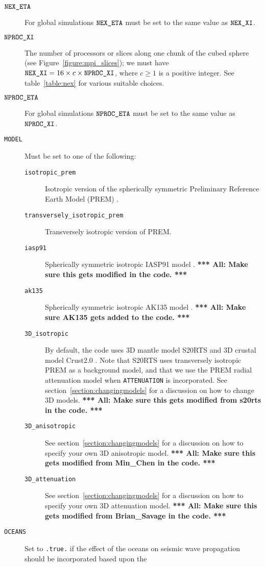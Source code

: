 \documentclass[onecolumn]{article}
\newcommand{\toall}[1]{\textbf{*** All: #1 ***}}
\newcommand{\nexxi}{\mbox{\texttt{NEX\_XI}}}
\newcommand{\nexeta}{\mbox{\texttt{NEX\_ETA}}}
\newcommand{\nprocxi}{\mbox{\texttt{NPROC\_XI}}}
\newcommand{\nproceta}{\mbox{\texttt{NPROC\_ETA}}}
\begin{document}
\begin{description}
\item[$\nexeta$] For global simulations $\nexeta$
must be set to the same value as $\nexxi$.
\item[$\nprocxi$] The number of processors or slices along one
chunk of the cubed sphere (see Figure~\ref{figure:mpi_slices});
we must have $\nexxi=16\times c\times \nprocxi$, where
$c\ge1$ is a positive integer.
See table~\ref{table:nex} for various suitable choices.
\item[$\nproceta$] For global simulations $\nproceta$
must be set to the same value as $\nprocxi$.
\item[\texttt{MODEL}] Must be set to one of the following:
\begin{description}
\item[\texttt{isotropic\_prem}] Isotropic version of the spherically symmetric
Preliminary Reference Earth Model (PREM) \cite{DzAn81}.
\item[\texttt{transversely\_isotropic\_prem}] Transversely
isotropic version of PREM.
\item[\texttt{iasp91}] Spherically symmetric isotropic IASP91 model \cite{KeEn91}.
\toall{Make sure this gets modified in the code.}
\item[\texttt{ak135}] Spherically symmetric isotropic AK135 model \cite{KeEnBu95}.
\toall{Make sure AK135 gets added to the code.}
\item[\texttt{3D\_isotropic}] By default,
the code uses 3D mantle model S20RTS \cite{RiVaWo99}
and 3D crustal model Crust2.0 \cite{BaLaMa00}.
Note that S20RTS uses transversely isotropic PREM as a background model,
and that we use the PREM radial attenuation model when
\texttt{ATTENUATION} is incorporated.
See section~\ref{section:changingmodels} for a discussion on
how to change 3D models.
\toall{Make sure this gets modified from s20rts in the code.}
\item[\texttt{3D\_anisotropic}]
See section~\ref{section:changingmodels} for a discussion on
how to specify your own 3D anisotropic model.
\toall{Make sure this gets modified from Min\_Chen in the code.}
\item[\texttt{3D\_attenuation}]
See section~\ref{section:changingmodels} for a discussion on
how to specify your own 3D attenuation model.
\toall{Make sure this gets modified from Brian\_Savage in the code.}
\end{description}
\item[\texttt{OCEANS}] Set to \texttt{.true.} if the effect of the oceans
on seismic wave propagation should be incorporated based upon the

\end{description}
\end{document}
